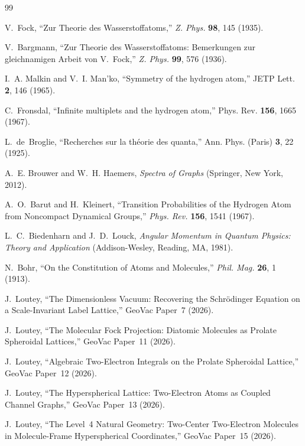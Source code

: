 \documentclass[aps,prl,reprint,amsmath,amssymb]{revtex4-2}
\begin{document}
\begin{thebibliography}{99}

V.~Fock,
``Zur Theorie des Wasserstoffatoms,''
\textit{Z. Phys.} \textbf{98}, 145 (1935).

V.~Bargmann,
``Zur Theorie des Wasserstoffatoms: Bemerkungen zur gleichnamigen
Arbeit von V.~Fock,''
\textit{Z. Phys.} \textbf{99}, 576 (1936).

I.~A. Malkin and V.~I. Man'ko,
``Symmetry of the hydrogen atom,''
JETP Lett. \textbf{2}, 146 (1965).

C.~Fronsdal,
``Infinite multiplets and the hydrogen atom,''
Phys. Rev. \textbf{156}, 1665 (1967).

L.~de~Broglie,
``Recherches sur la th\'eorie des quanta,''
Ann. Phys. (Paris) \textbf{3}, 22 (1925).

A.~E. Brouwer and W.~H. Haemers,
\textit{Spectra of Graphs} (Springer, New York, 2012).

A.~O.~Barut and H.~Kleinert,
``Transition Probabilities of the Hydrogen Atom from Noncompact
Dynamical Groups,''
\textit{Phys. Rev.} \textbf{156}, 1541 (1967).

L.~C.~Biedenharn and J.~D.~Louck,
\textit{Angular Momentum in Quantum Physics: Theory and Application}
(Addison-Wesley, Reading, MA, 1981).

N.~Bohr,
``On the Constitution of Atoms and Molecules,''
\textit{Phil. Mag.} \textbf{26}, 1 (1913).

J.~Loutey,
``The Dimensionless Vacuum: Recovering the Schr\"odinger Equation
on a Scale-Invariant Label Lattice,''
GeoVac Paper~7 (2026).

J.~Loutey,
``The Molecular Fock Projection: Diatomic Molecules as Prolate
Spheroidal Lattices,''
GeoVac Paper~11 (2026).

J.~Loutey,
``Algebraic Two-Electron Integrals on the Prolate Spheroidal
Lattice,''
GeoVac Paper~12 (2026).

J.~Loutey,
``The Hyperspherical Lattice: Two-Electron Atoms as Coupled
Channel Graphs,''
GeoVac Paper~13 (2026).

J.~Loutey,
``The Level~4 Natural Geometry: Two-Center Two-Electron Molecules
in Molecule-Frame Hyperspherical Coordinates,''
GeoVac Paper~15 (2026).


\end{thebibliography}
\end{document}
